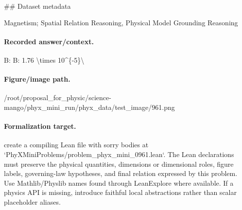 \#\# Dataset metadata

Magnetism; Spatial Relation Reasoning, Physical Model Grounding Reasoning

\paragraph{Recorded answer/context.}
B: B: 1.76 \textbackslash{}times 10\textasciicircum{}\{-5\}\textbackslash{}

\paragraph{Figure/image path.}
/root/proposal\_for\_physic/science-mango/phyx\_mini\_run/phyx\_data/test\_image/961.png

\paragraph{Formalization target.}
create a compiling Lean file with sorry bodies at `PhyXMiniProblems/problem\_phyx\_mini\_0961.lean`. The Lean declarations must preserve the physical quantities, dimensions or dimensional roles, figure labels, governing-law hypotheses, and final relation expressed by this problem.
Use Mathlib/Physlib names found through LeanExplore where available. If a physics API is missing, introduce faithful local abstractions rather than scalar placeholder aliases.

